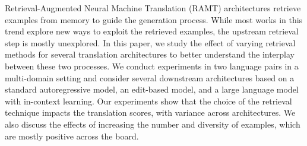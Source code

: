 Retrieval-Augmented Neural Machine Translation (RAMT) architectures retrieve examples from memory to guide the generation process. While most works in this trend explore new ways to exploit the retrieved examples, the upstream retrieval step is mostly unexplored. In this paper, we study the effect of varying retrieval methods for several translation architectures to better understand the interplay between these two processes. We conduct experiments in two language pairs in a multi-domain setting and consider several downstream architectures based on a standard autoregressive model, an edit-based model, and a large language model with in-context learning. Our experiments show that the choice of the retrieval technique impacts the translation scores, with variance across architectures. We also discuss the effects of increasing the number and diversity of examples, which are mostly positive across the board.